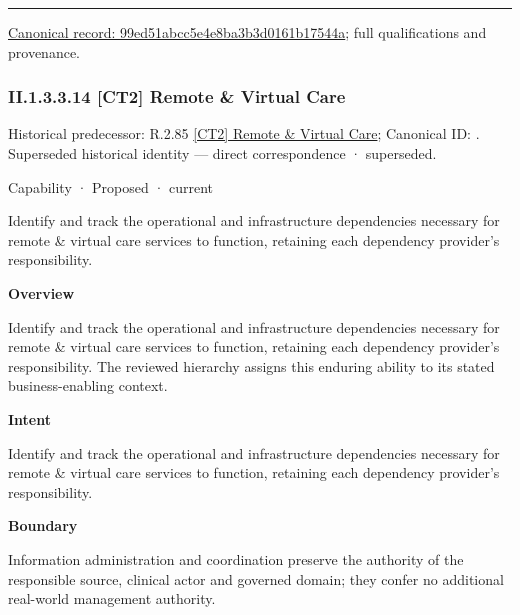 \medskip\hrule\medskip

{\footnotesize \href{../../../../../../../continuum/strategy/capability/99ed51abcc5e4e8ba3b3d0161b17544a.md}{Canonical record: 99ed51abcc5e4e8ba3b3d0161b17544a}; full qualifications and provenance.}\par
\subsubsection*{II.1.3.3.14 [CT2] Remote \& Virtual Care}
\label{navigation:II.1.3.3.14}

{\small Historical predecessor: R.2.85 \hyperref[element:75e2b447659c4fdf94107d94758337ed]{[CT2] Remote \& Virtual Care}; Canonical ID: \texttt{}. Superseded historical identity — direct correspondence · superseded.}\par
\label{element:30dff22d40b64da29ede7c41673db085}
{\small Capability · Proposed · current}\par

Identify and track the operational and infrastructure dependencies necessary for remote \& virtual care services to function, retaining each dependency provider's responsibility.



\textbf{Overview}



Identify and track the operational and infrastructure dependencies necessary for remote \& virtual care services to function, retaining each dependency provider's responsibility. The reviewed hierarchy assigns this enduring ability to its stated business-enabling context.



\textbf{Intent}



Identify and track the operational and infrastructure dependencies necessary for remote \& virtual care services to function, retaining each dependency provider's responsibility.



\textbf{Boundary}



Information administration and coordination preserve the authority of the responsible source, clinical actor and governed domain; they confer no additional real-world management authority.


